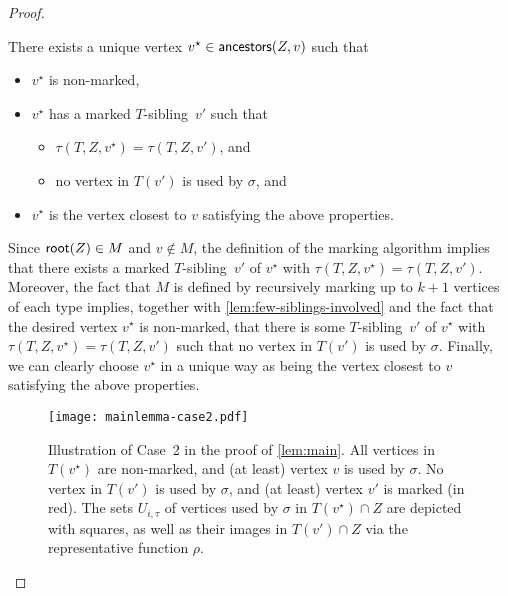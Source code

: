 \documentclass[a4paper,UKenglish,cleveref, autoref, thm-restate]{lipics-v2021}
\newenvironment{cproof}{\proof[Proof of claim]\renewcommand\qedsymbol{$\diamond$}}{\endproof}
\renewcommand{\root}{{\sf root}\xspace}
\newcommand{\anc}{{\sf ancestors}\xspace}
\begin{document}
\begin{proof}
\begin{claim}\label{claim:vertex-vstar-exists}
There exists a unique vertex $v^{\star} \in \anc(Z,v)$ such that
\begin{itemize}
  \item $v^{\star}$ is non-marked,
  \item $v^{\star}$  has a marked $T$-sibling~$v'$ such that
      \begin{itemize}
        \item $\tau(T,Z,v^{\star})=\tau(T,Z,v')$, and
        \item no vertex in $T(v')$ is used by $\sigma$, and
      \end{itemize}
  \item $v^{\star}$  is the vertex closest to $v$ satisfying the above properties.
\end{itemize}
\end{claim}
\begin{cproof}
Since $\root(Z) \in M$ and $v \notin M$, the definition of the marking algorithm implies that there exists a marked $T$-sibling~$v'$ of $v^{\star}$ with $\tau(T,Z,v^{\star})=\tau(T,Z,v')$. Moreover,  the fact that $M$ is defined by recursively marking up to $k+1$ vertices of each type implies, together with \autoref{lem:few-siblings-involved} and the fact that the desired vertex $v^{\star}$ is non-marked, that there is some $T$-sibling~$v'$ of $v^{\star}$ with $\tau(T,Z,v^{\star})=\tau(T,Z,v')$ such that no vertex in $T(v')$ is used by $\sigma$.
Finally, we can clearly choose $v^{\star}$ in a unique way as being the vertex closest to $v$ satisfying the above properties.
\end{cproof}


\begin{figure}[h!tb]
    \centering
    \vspace{-.15cm}
    \hspace{-.75cm}\texttt{[image: mainlemma-case2.pdf]}
    \caption{Illustration of Case~2 in the proof of  \autoref{lem:main}. All vertices in $T(v^{\star})$ are non-marked,  and (at least) vertex $v$ is used by $\sigma$. No vertex in $T(v')$ is used by $\sigma$, and (at least) vertex $v'$ is marked (in red). The sets $U_{i,\tau}$ of vertices used by $\sigma$ in $T(v^{\star}) \cap Z$ are depicted with squares, as well as their images in $T(v') \cap Z$ via the representative function $\rho$.\label{fig:mainlemma-case2}}
\end{figure}




\end{proof}
\end{document}
